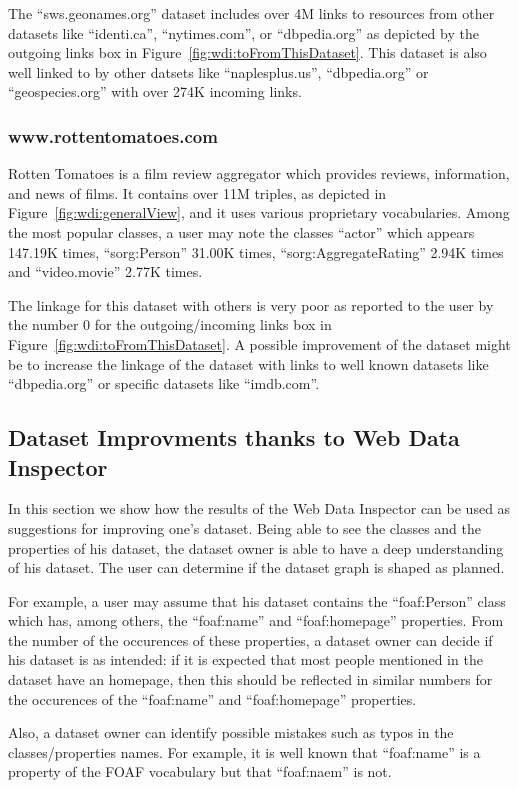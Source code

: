 The ``sws.geonames.org'' dataset includes over 4M links to resources from other datasets like ``identi.ca'', ``nytimes.com'', or ``dbpedia.org'' as depicted by the outgoing links box in Figure~\ref{fig:wdi:toFromThisDataset}. This dataset is also well linked to by other datsets like ``naplesplus.us'', ``dbpedia.org'' or ``geospecies.org'' with over 274K incoming links.

\subsubsection{www.rottentomatoes.com}

Rotten Tomatoes is a film review aggregator which provides reviews, information, and news of films. It contains over 11M triples, as depicted in Figure~\ref{fig:wdi:generalView}, and it uses various proprietary vocabularies. Among the most popular classes, a user may note the classes ``actor'' which appears 147.19K times, ``sorg:Person'' 31.00K times, ``sorg:AggregateRating'' 2.94K times and ``video.movie'' 2.77K times.

The linkage for this dataset with others is very poor as reported to the user by the number 0 for the outgoing/incoming links box in Figure~\ref{fig:wdi:toFromThisDataset}. A possible improvement of the dataset might be to increase the linkage of the dataset with links to well known datasets like ``dbpedia.org'' or specific datasets like ``imdb.com''.

\subsection{Dataset Improvments thanks to Web Data Inspector}

In this section we show how the results of the Web Data Inspector can be used as suggestions for improving one's dataset. Being able to see the classes and the properties of his dataset, the dataset owner is able to have a deep understanding of his dataset. The user can determine if the dataset graph is shaped as planned.

For example, a user may assume that his dataset contains the ``foaf:Person'' class which has, among others, the ``foaf:name'' and ``foaf:homepage'' properties. From the number of the occurences of these properties, a dataset owner can decide if his dataset is as intended: if it is expected that most people mentioned in the dataset have an homepage, then this should be reflected in similar numbers for the occurences of the ``foaf:name'' and ``foaf:homepage'' properties.

Also, a dataset owner can identify possible mistakes such as typos in the classes/properties names. For example, it is well known that ``foaf:name'' is a property of the FOAF vocabulary but that ``foaf:naem'' is not.
